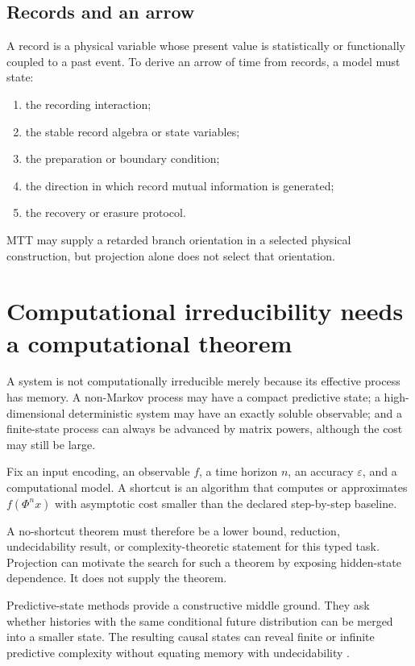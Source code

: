 \documentclass[11pt]{article}
\begin{document}
\subsection{Records and an arrow}

A record is a physical variable whose present value is statistically or
functionally coupled to a past event.  To derive an arrow of time from
records, a model must state:
\begin{enumerate}
\item the recording interaction;
\item the stable record algebra or state variables;
\item the preparation or boundary condition;
\item the direction in which record mutual information is generated;
\item the recovery or erasure protocol.
\end{enumerate}
MTT may supply a retarded branch orientation in a selected physical
construction, but projection alone does not select that orientation.

\section{Computational irreducibility needs a computational theorem}

A system is not computationally irreducible merely because its effective
process has memory.  A non-Markov process may have a compact predictive
state; a high-dimensional deterministic system may have an exactly soluble
observable; and a finite-state process can always be advanced by matrix
powers, although the cost may still be large.

\begin{definition}
Fix an input encoding, an observable $f$, a time horizon $n$, an accuracy
$\varepsilon$, and a computational model.  A shortcut is an algorithm that
computes or approximates $f(\Phi^n x)$ with asymptotic cost smaller than the
declared step-by-step baseline.
\end{definition}

A no-shortcut theorem must therefore be a lower bound, reduction,
undecidability result, or complexity-theoretic statement for this typed
task.  Projection can motivate the search for such a theorem by exposing
hidden-state dependence.  It does not supply the theorem.

Predictive-state methods provide a constructive middle ground.  They ask
whether histories with the same conditional future distribution can be
merged into a smaller state.  The resulting causal states can reveal finite
or infinite predictive complexity without equating memory with
undecidability \cite{crutchfield_young,shalizi_crutchfield}.
\end{document}
